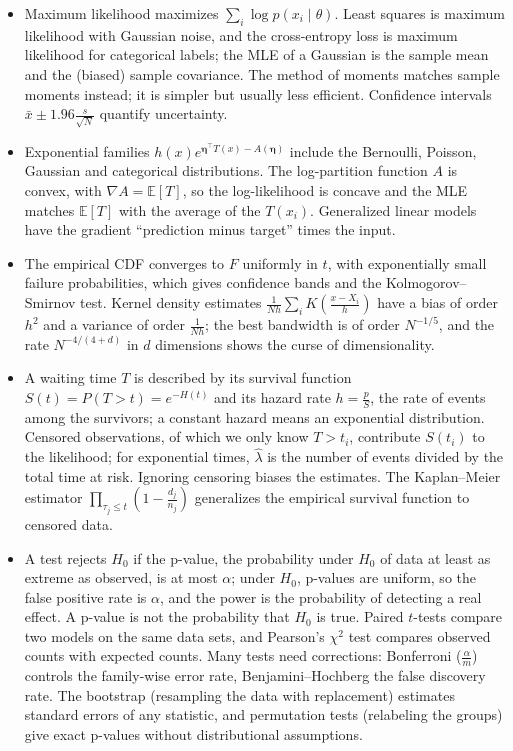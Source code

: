 \documentclass[11pt]{article}
\newcommand{\E}{\mathbb{E}}
\theoremstyle{definition}
\theoremstyle{plain}
\theoremstyle{remark}
\begin{document}
\begin{itemize}[leftmargin=*]
    \item Maximum likelihood maximizes $\sum_i \log p(x_i \mid \theta)$. Least squares is maximum likelihood with Gaussian noise, and the cross-entropy loss is maximum likelihood for categorical labels; the MLE of a Gaussian is the sample mean and the (biased) sample covariance. The method of moments matches sample moments instead; it is simpler but usually less efficient. Confidence intervals $\bar x \pm 1.96\frac{s}{\sqrt{N}}$ quantify uncertainty.
    \item Exponential families $h(x)e^{\boldsymbol{\eta}^\top T(x) - A(\boldsymbol{\eta})}$ include the Bernoulli, Poisson, Gaussian and categorical distributions. The log-partition function $A$ is convex, with $\nabla A = \E[T]$, so the log-likelihood is concave and the MLE matches $\E[T]$ with the average of the $T(x_i)$. Generalized linear models have the gradient ``prediction minus target'' times the input.
    \item The empirical CDF converges to $F$ uniformly in $t$, with exponentially small failure probabilities, which gives confidence bands and the Kolmogorov--Smirnov test. Kernel density estimates $\frac{1}{Nh}\sum_i K(\frac{x - X_i}{h})$ have a bias of order $h^2$ and a variance of order $\frac{1}{Nh}$; the best bandwidth is of order $N^{-1/5}$, and the rate $N^{-4/(4+d)}$ in $d$ dimensions shows the curse of dimensionality.
    \item A waiting time $T$ is described by its survival function $S(t) = P(T > t) = e^{-H(t)}$ and its hazard rate $h = \frac{p}{S}$, the rate of events among the survivors; a constant hazard means an exponential distribution. Censored observations, of which we only know $T > t_i$, contribute $S(t_i)$ to the likelihood; for exponential times, $\hat\lambda$ is the number of events divided by the total time at risk. Ignoring censoring biases the estimates. The Kaplan--Meier estimator $\prod_{\tau_j \leq t}(1 - \frac{d_j}{n_j})$ generalizes the empirical survival function to censored data.
    \item A test rejects $H_0$ if the p-value, the probability under $H_0$ of data at least as extreme as observed, is at most $\alpha$; under $H_0$, p-values are uniform, so the false positive rate is $\alpha$, and the power is the probability of detecting a real effect. A p-value is not the probability that $H_0$ is true. Paired $t$-tests compare two models on the same data sets, and Pearson's $\chi^2$ test compares observed counts with expected counts. Many tests need corrections: Bonferroni ($\frac{\alpha}{m}$) controls the family-wise error rate, Benjamini--Hochberg the false discovery rate. The bootstrap (resampling the data with replacement) estimates standard errors of any statistic, and permutation tests (relabeling the groups) give exact p-values without distributional assumptions.

\end{itemize}
\end{document}
